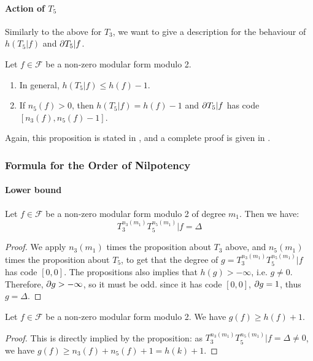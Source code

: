 \paragraph{Action of $T_5$}
Similarly to the above for $T_3$, we want to give a description for the behaviour of $h(T_5|f)$ and $\partial T_5|f$.
\label{propositionActionT5}
\begin{proposition}
	Let $f \in \mathcal{F}$ be a non-zero modular form modulo 2.
	\begin{enumerate}
		\item In general, $h(T_5|f) \leq h(f)-1$.
		\item If $n_5(f)>0$, then $h(T_5|f) = h(f)-1$ and $\partial T_5|f$ has code $\left[ n_3(f), n_5(f)-1 \right] $.
	\end{enumerate}
\end{proposition}
Again, this proposition is stated in \cite[§4]{OrdreNilpotenceOperateurHecke}, and a complete proof is given in \cite{ModularFormsMcGill}.



\subsubsection{Formula for the Order of Nilpotency}
\paragraph{Lower bound}
\begin{property}
	Let $f \in \mathcal{F}$ be a non-zero modular form modulo 2 of degree $m_1$.
	Then we have:
	$$
	T_3^{n_3(m_1)} T_5^{n_5(m_1)} | f = \Delta
	$$
\end{property}
\begin{proof}
	We apply $n_3(m_1)$ times the proposition about $T_3$ above, and $n_5(m_1)$ times the proposition about $T_5$, to get that the degree of $g = T_3^{n_3(m_1)}T_5^{n_5(m_1)}|f$ has code $\left[ 0,0 \right]$.
	The propositions also implies that $h(g) > -\infty$, i.e. $g \neq 0$.
	Therefore, $\partial g > -\infty$, so it must be odd. since it has code $\left[ 0,0 \right]$,  $\partial g = 1$, thus $g = \Delta$.
\end{proof}

\begin{corollary}
	Let $f \in \mathcal{F}$ be a non-zero modular form modulo 2.
	We have $g(f) \geq h(f) +1$.
\end{corollary}
\begin{proof}
	This is directly implied by the proposition:
	as $T_3^{n_3(m_1)}T_5^{n_5(m_1)}|f = \Delta \neq 0$, we have $g(f) \geq n_3(f)+n_5(f)+1 = h(k)+1$.
\end{proof}

